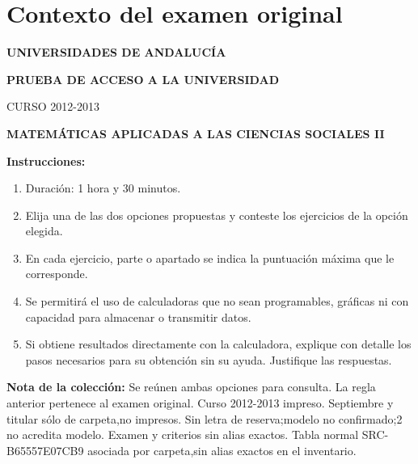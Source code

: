 \section*{Contexto del examen original}
\textbf{UNIVERSIDADES DE ANDALUCÍA}\par
\textbf{PRUEBA DE ACCESO A LA UNIVERSIDAD}\par
CURSO 2012-2013\par
\textbf{MATEMÁTICAS APLICADAS A LAS CIENCIAS SOCIALES II}

\textbf{Instrucciones:}
\begin{enumerate}[label=\textbf{\alph*)}]
  \item Duración: 1 hora y 30 minutos.
  \item Elija una de las dos opciones propuestas y conteste los ejercicios de la opción elegida.
  \item En cada ejercicio, parte o apartado se indica la puntuación máxima que le corresponde.
  \item Se permitirá el uso de calculadoras que no sean programables, gráficas ni con capacidad para almacenar o transmitir datos.
  \item Si obtiene resultados directamente con la calculadora, explique con detalle los pasos necesarios para su obtención sin su ayuda. Justifique las respuestas.
\end{enumerate}
\noindent\textbf{Nota de la colección:} Se reúnen ambas opciones para consulta. La regla anterior pertenece al examen original. Curso 2012-2013 impreso. Septiembre y titular sólo de carpeta,no impresos. Sin letra de reserva;modelo no confirmado;2 no acredita modelo. Examen y criterios sin alias exactos. Tabla normal SRC-B65557E07CB9 asociada por carpeta,sin alias exactos en el inventario.
\par\medskip
